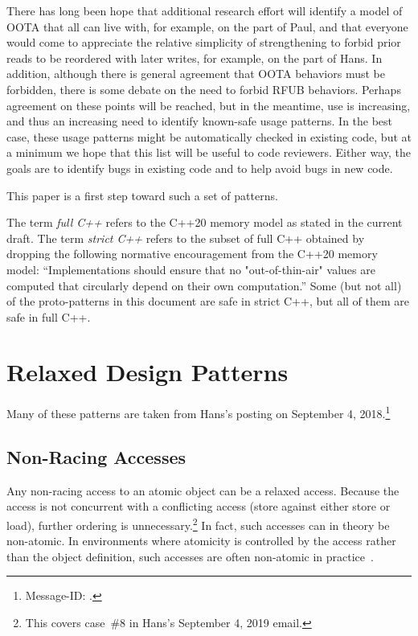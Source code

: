 \documentclass[10]{article}
\begin{document}
There has long been hope that additional research effort will identify
a model of OOTA that all can live with, for example, on the part of Paul,
and that everyone would come to appreciate the relative simplicity of
strengthening  to forbid prior reads to be
reordered with later writes, for example, on the part of Hans.
In addition, although there is general agreement that OOTA behaviors
must be forbidden, there is some debate on the need to forbid
RFUB behaviors.
Perhaps agreement on these points will be reached, but in the meantime,
 use is increasing, and thus an increasing need
to identify known-safe usage patterns.
In the best case, these usage patterns might be automatically checked
in existing code, but at a minimum we hope that this list will be
useful to code reviewers.
Either way, the goals are to identify bugs in existing code and to
help avoid bugs in new code.

This paper is a first step toward such a set of patterns.

The term \emph{full C++} refers to the C++20 memory model as stated in
the current draft.
The term \emph{strict C++} refers to the subset of full C++ obtained
by dropping the following normative encouragement from the C++20 memory
model:
``Implementations should ensure that no "out-of-thin-air" values are
computed that circularly depend on their own computation.''
Some (but not all) of the proto-patterns in this document are safe in
strict C++, but all of them are safe in full C++.

\section{Relaxed Design Patterns}
\label{sec:Relaxed Design Patterns}

Many of these patterns are taken from Hans's 
posting on September 4, 2018.\footnote{
	Message-ID: .}

\subsection{Non-Racing Accesses}
\label{sec:Non-Racing Accesses}

Any non-racing access to an atomic object can be a relaxed access.
Because the access is not concurrent with a conflicting access (store
against either store or load), further ordering is unnecessary.\footnote{
	This covers case~\#8 in Hans's September 4, 2019 email.}
In fact, such accesses can in theory be non-atomic.
In environments where atomicity is controlled by the access rather
than the object definition, such accesses are often non-atomic in
practice~\cite{JadeAlglave2019WhoAfraidCompiler}.
\end{document}
